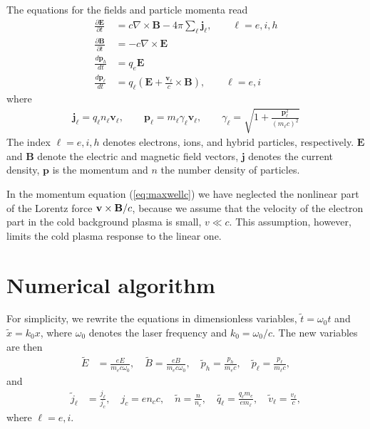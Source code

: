 \documentclass[conference]{IEEEtran}
\newcommand{\ddt}[1]{\frac{d #1}{dt}}
\newcommand{\ppt}[1]{\frac{\partial #1}{\partial t}}
\renewcommand{\~}{\widetilde }
\begin{document}
The equations for the fields and particle momenta read
\begin{subequations}\label{eq:maxwell}
\begin{align}
\ppt{\textbf{E}} &=c\nabla\times \textbf{B}-4\pi\sum_\ell \textbf{j}_\ell,
\qquad\ell=e,i,h
\label{eq:maxwella}\\ 
\ppt{\textbf{B}} &=-c\nabla\times \textbf{E} \label{eq:maxwellb}\\
\ddt{\textbf{p}_h} &=q_e\textbf{E} \label{eq:maxwellc}\\
\ddt{\textbf{p}_\ell} &= q_\ell (\textbf{E}+\frac{\textbf{v}_\ell}{c} \times
\textbf{B}), \qquad\ell=e,i \label{eq:maxwelld} 
\end{align}
\end{subequations}
where 
\begin{align*}
 \textbf{j}_\ell=q_\ell n_\ell \textbf{v}_\ell, \qquad \textbf{p}_\ell=m_\ell
\gamma_\ell \textbf{v}_\ell, \qquad
  \gamma_\ell = \sqrt{1+\frac{\textbf{p}_\ell^2}{(m_\ell c)^2}}
\end{align*}
The index $\ell=e,i,h$ denotes electrons, ions, and
hybrid particles, respectively. $\textbf{E}$ and $\textbf{B}$ denote the electric
and magnetic field vectors, $\textbf{j}$ denotes the current density,
$\textbf{p}$ is the momentum and $n$ the number density of particles.

In the momentum equation (\ref{eq:maxwellc}) we have
neglected the nonlinear part of the Lorentz force ${\bf v \times
B}/c$, because we assume that the velocity of the electron part in the
cold background plasma is small, $v \ll c$. This assumption, however, limits the
cold plasma response to the linear one.

\section{Numerical algorithm}\label{sec:math_alg}

For simplicity, we rewrite the equations in dimensionless variables,
$\~t =\omega_0 t$ and $\~x= k_0 x$, where $\omega_0$ denotes the laser
frequency and $k_0=\omega_0/c$. The new variables are then
\begin{align*}
  {\~E} &= \frac{ eE}{m_ec\omega_0}, \quad
  \~B = \frac{ eB}{m_ec\omega_0}, \quad
  \~p_h = \frac{ p_h}{m_e c}, \quad
  \~p_\ell = \frac{ p_\ell}{m_\ell c}, %
\end{align*}
and
\begin{align*}  
  \~j_\ell &= \frac{ j_\ell}{j_c}, \quad j_c = e n_c c, \quad
  \~n = \frac{n}{n_c}, \quad \~{q_\ell} = \frac{q_\ell m_e}{em_\ell}, \quad
  \~v_\ell = \frac{v_\ell}{c},
\end{align*}
where $\ell=e,i$.
\end{document}
